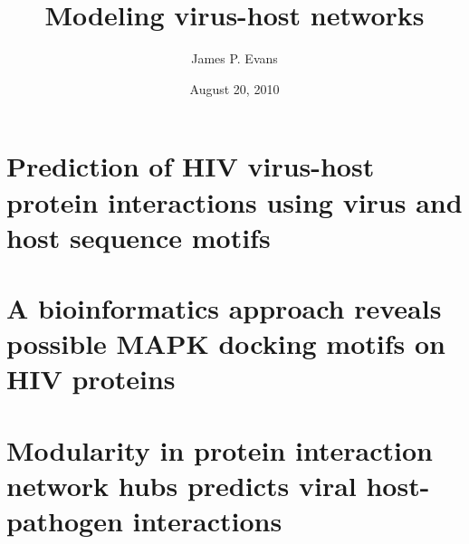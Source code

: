 \documentclass[12pt]{report}%
\begin{document}

  \clearpage

  \title{Modeling virus-host networks}

  \author{James P. Evans}
  \date{August 20, 2010}



  \beforepreface
  

  \clearpage
  \abstractp

  

  \clearpage

  \tableofcontents

  \tablespagetrue
  \listoftables
  \figurespagetrue
  \listoffigures



  \clearpage

  
  \chapter{Prediction of HIV virus-host protein interactions using virus and host sequence motifs} \label{chapter:predict}
  
\chapter{A bioinformatics approach reveals possible MAPK docking motifs on HIV proteins} \label{chapter:mapk}
  
  \chapter{Modularity in protein interaction network hubs predicts viral host-pathogen interactions} \label{chapter:hubs}
   


  \appendix
  


  
  
\end{document}
